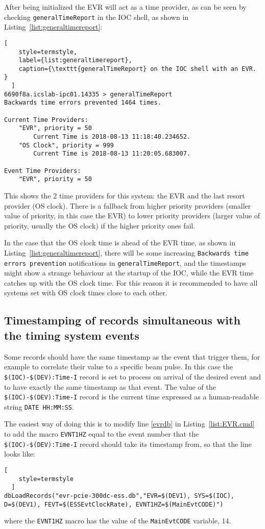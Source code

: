 \documentclass[11pt
  , a4paper
  , article
  , oneside
  , showtrims
]{memoir}
\begin{document}
After being initialized the EVR will act as a time provider, as can be seen by checking \texttt{generalTimeReport} in the IOC shell, as shown in Listing~\ref{list:generaltimereport}:
\begin{lstlisting}[
    style=termstyle,
    label={list:generaltimereport},
    caption={\texttt{generalTimeReport} on the IOC shell with an EVR. }
  ]
6690f8a.icslab-ipc01.14335 > generalTimeReport
Backwards time errors prevented 1464 times.

Current Time Providers:
    "EVR", priority = 50
        Current Time is 2018-08-13 11:18:40.234652.
    "OS Clock", priority = 999
        Current Time is 2018-08-13 11:20:05.683007.

Event Time Providers:
    "EVR", priority = 50

\end{lstlisting}
This shows the 2 time providers for this system: the EVR and the last resort provider (OS clock). There is a fallback from higher priority providers (smaller value of priority, in this case the EVR) to lower priority providers (larger value of priority, usually the OS clock) if the higher priority ones fail.

In the case that the OS clock time is ahead of the EVR time, as shown in Listing~\ref{list:generaltimereport}, there will be some increasing \texttt{Backwards time errors prevention} notifications in \texttt{generalTimeReport}, and the timestamps might show a strange behaviour at the startup of the IOC, while the EVR time catches up with the OS clock time. For this reason it is recommended to have all systems set with OS clock times close to each other.

\subsection{Timestamping of records simultaneous with the timing system events}
Some records should have the same timestamp as the event that trigger them, for example to correlate their value to a specific beam pulse. In this case the \texttt{\$(IOC)-\$(DEV):Time-I} record is set to process on arrival of the desired event and to have exactly the same timestamp as that event. The value of the  \texttt{\$(IOC)-\$(DEV):Time-I} record is the current time expressed as a human-readable string \texttt{DATE HH:MM:SS}.

The easiest way of doing this is to modify line \ref{evrdb} in Listing~\ref{list:EVR.cmd} to add the macro \texttt{EVNT1HZ} equal to the event number that the \texttt{\$(IOC)-\$(DEV):Time-I} record should take its timestamp from, so that the line looks like:
\begin{lstlisting}[
    style=termstyle
  ]
dbLoadRecords("evr-pcie-300dc-ess.db","EVR=$(DEV1), SYS=$(IOC), D=$(DEV1), FEVT=$(ESSEvtClockRate), EVNT1HZ=$(MainEvtCODE)")
\end{lstlisting}
where the \texttt{EVNT1HZ} macro has the value of the \texttt{MainEvtCODE} variable, 14.
\end{document}
